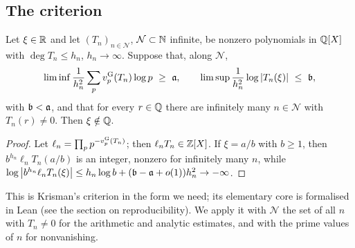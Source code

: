 \subsection{The criterion}\label{subsec:criterion}

\begin{proposition}\label{prop:criterion}
Let $\xi\in\mathbb{R}$ and let $(T_n)_{n\in\mathcal N}$, $\mathcal N\subset\mathbb{N}$ infinite, be nonzero
polynomials in $\mathbb{Q}[X]$ with $\deg T_n\le h_n$, $h_n\to\infty$. Suppose that, along $\mathcal N$,
\[
  \liminf\frac1{h_n^2}\sum_p\vG p(T_n)\log p\ \ge\ \aconst,\qquad
  \limsup\frac1{h_n^2}\log\abs{T_n(\xi)}\ \le\ \bconst,
\]
with $\mathfrak{b}<\mathfrak{a}$, and that for every $r\in\mathbb{Q}$ there are infinitely many $n\in\mathcal N$
with $T_n(r)\ne0$. Then $\xi\notin\mathbb{Q}$.
\end{proposition}

\begin{proof}
Let $\ell_n=\prod_pp^{-v_{p}^{\mathrm{G}}(T_n)}$; then $\ell_nT_n\in\mathbb{Z}[X]$. If $\xi=a/b$ with $b\ge1$, then
$b^{h_n}\ell_nT_n(a/b)$ is an integer, nonzero for infinitely many $n$, while
$\log\left\lvert b^{h_n}\ell_nT_n(\xi)\right\rvert\le h_n\log b+(\mathfrak{b}-\mathfrak{a}+o(1))h_n^2\to-\infty$.
\end{proof}

This is Krisman's criterion \cite[Prop.~3.1, Thm.~3.2]{Krisman2026chi2} in the form we need;
its elementary core is formalised in Lean (see the section on reproducibility). We apply it with
$\mathcal N$ the set of all $n$ with $T_n\ne0$ for the arithmetic and analytic estimates, and with
the prime values of $n$ for nonvanishing.
